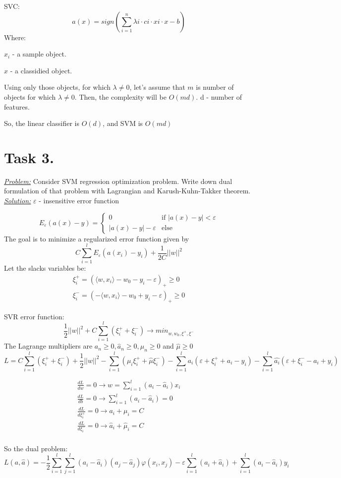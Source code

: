 \documentclass[a4paper,12pt]{article}
\begin{document}
SVC:
\[
    a(x) = sign(\sum\limits_{i=1}^{n} \lambda i\cdot ci\cdot xi\cdot x - b)
\]
Where:

\(x_i\) - a sample object.

\(x\) - a classidied object.

Using only those objects, for which \(\lambda \neq 0\), let's assume that \(m\) is number of objects for which \(\lambda \neq 0\). Then, the complexity will be \(O(md)\). d - number of features.

So, the linear classifier is \(O(d)\), and SVM is \(O(md)\)


\newpage
\section*{Task 3.}
\underline{\textit{Problem:}} Consider SVM regression optimization problem. Write down dual formulation of that problem with
Lagrangian and Karush-Kuhn-Takker theorem.\\
\newline
\underline{\textit{Solution:}} \(\varepsilon\) - insensitive error function

\[
    E_\varepsilon(a(x) - y)=
    \begin{cases}
        0 &\mbox{if } |a(x) - y| < \varepsilon \\
        |a(x) - y| - \varepsilon &\mbox{else} 
    \end{cases}
\]
The goal is to minimize a regularized error function given by
\[
    C\sum^l_{i=1}E_\varepsilon(a(x_i)-y_i)+\frac{1}{2C}||w||^2
\]
Let the slacks variables be:
\begin{gather}
    \xi^+_i = (\langle w,x_i \rangle - w_0 - y_i - \varepsilon)_+ \geqslant 0\\
    \xi^-_i = (-\langle w,x_i \rangle - w_0 + y_i - \varepsilon)_+ \geqslant 0
\end{gather}

SVR error function:
\[
    \frac{1}{2}||w||^2 + C\sum_{i=1}^l(\xi_i^++\xi_i^-) \rightarrow min_{w,w_0,\xi^+,\xi^-}
\]
The Lagrange multipliers are \(a_n\geqslant 0,\hat{a}_n \geqslant 0, \mu_n\geqslant0\) and \(\hat{\mu}\geqslant 0\)
\[
    L = C\sum_{i=1}^l(\xi_i^++\xi_i^-) + \frac12||w||^2 - \sum_{i=1}^l(\mu_i\xi_i^++\hat{\mu}\xi_i^-) - \sum_{i=1}^la_i(\varepsilon+\xi_i^++a_i-y_i) - \sum_{i=1}^l\hat{a_i}(\varepsilon+\xi_i^--a_i+y_i)
\]

\begin{gather}
    \frac{dL}{dw}=0 \rightarrow w = \sum_{i=1}^l(a_i-\hat{a}_i)x_i\\
    \frac{dL}{db}=0 \rightarrow \sum_{i=1}^l(a_i-\hat{a}_i) = 0\\
    \frac{dL}{d\xi_i^+}=0 \rightarrow a_i+\mu_i = C\\
    \frac{dL}{d\xi_i^-}=0 \rightarrow \hat{a}_i+\hat{\mu}_i = C\\
\end{gather}

So the dual problem:
\[
    L(a,\hat{a}) = -\frac12\sum_{i=1}^l\sum_{j=1}^l(a_i-\hat{a}_i)(a_j-\hat{a}_j)\varphi(x_i,x_j)-\varepsilon \sum_{i=1}^l(a_i+\hat{a}_i)+\sum_{i=1}^l(a_i-\hat{a}_i)y_i
\]
\end{document}
